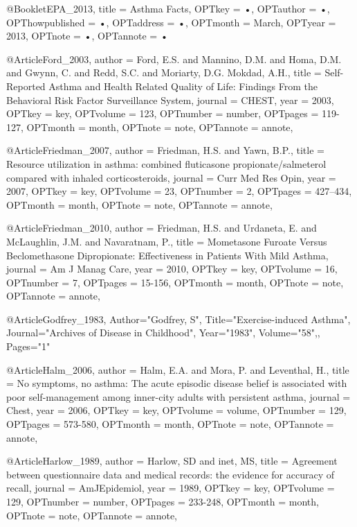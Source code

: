 {{@Booklet{EPA_2013,
title = {Asthma Facts},
OPTkey = {•},
OPTauthor = {•},
OPThowpublished = {•},
OPTaddress = {•},
OPTmonth = {March},
OPTyear = {2013},
OPTnote = {•},
OPTannote = {•}
}



@Article{Ford_2003,
author = {Ford, E.S. and Mannino, D.M. and Homa, D.M. and Gwynn, C. and Redd, S.C. and Moriarty, D.G. Mokdad, A.H.},
title = {Self-Reported Asthma and Health Related Quality of Life: Findings From the Behavioral Risk Factor Surveillance System},
journal = {CHEST},
year = {2003},
OPTkey = {key},
OPTvolume = {123},
OPTnumber = {number},
OPTpages = {119-127},
OPTmonth = {month},
OPTnote = {note},
OPTannote = {annote},
}

@Article{Friedman_2007,
author = {Friedman, H.S. and Yawn, B.P.},
title = {Resource utilization in asthma:
combined fluticasone propionate/salmeterol compared with inhaled corticosteroids},
journal = {Curr Med Res Opin},
year = {2007},
OPTkey = {key},
OPTvolume = {23},
OPTnumber = {2},
OPTpages = {427–434},
OPTmonth = {month},
OPTnote = {note},
OPTannote = {annote},
}


@Article{Friedman_2010,
author = {Friedman, H.S. and Urdaneta, E. and McLaughlin, J.M. and Navaratnam, P.},
title = {Mometasone Furoate Versus Beclomethasone Dipropionate: Effectiveness in Patients With Mild Asthma},
journal = {Am J Manag Care},
year = {2010},
OPTkey = {key},
OPTvolume = {16},
OPTnumber = {7},
OPTpages = {15-156},
OPTmonth = {month},
OPTnote = {note},
OPTannote = {annote},
}


@Article{Godfrey_1983,
   Author="Godfrey, S",
   Title="{Exercise-induced Asthma}",
   Journal="Archives of Disease in Childhood",
   Year="1983",
   Volume="58",,
   Pages="1"
}


@Article{Halm_2006,
author = {Halm, E.A. and Mora, P. and Leventhal, H.},
title = {No symptoms, no asthma: The acute episodic disease belief is associated with poor self-management among inner-city adults with persistent asthma},
journal = {Chest},
year = {2006},
OPTkey = {key},
OPTvolume = {volume},
OPTnumber = {129},
OPTpages = {573-580},
OPTmonth = {month},
OPTnote = {note},
OPTannote = {annote},
}

@Article{Harlow_1989,
author = {Harlow, SD and inet, MS},
title = {Agreement between questionnaire data and medical records: the evidence for accuracy of recall},
journal = {AmJEpidemiol},
year = {1989},
OPTkey = {key},
OPTvolume = {129},
OPTnumber = {number},
OPTpages = {233-248},
OPTmonth = {month},
OPTnote = {note},
OPTannote = {annote},
}

}}
